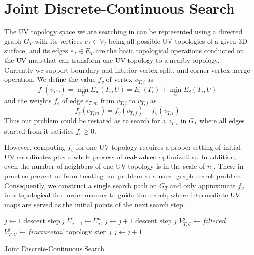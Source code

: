 
\section{Joint Discrete-Continuous Search}

The UV topology space we are searching in can be represented using a directed graph $G_T$ with its vertices $v_T \in V_T$ being all possible UV topologies of a given 3D surface, and its edges $e_T \in E_T$ are the basic topological operations conducted on the UV map that can transform one UV topology to a nearby topology. Currently we support boundary and interior vertex split, and corner vertex merge operation.
We define the value $f_v$ of vertex $v_{T,i}$ as 
\[ f_v(v_{T,i}) = \min_{U} E_w(T_i, U) = E_s(T_i) + \min_{U} E_d(T_i, U) \]
and the weights $f_e$ of edge $e_{T,m}$ from $v_{T,i}$ to $v_{T,j}$ as 
\[ f_e(e_{T,m}) = f_v(v_{T,j}) - f_v(v_{T,i}) \]
Thus our problem could be restated as to search for a $v_{T,i}$ in $G_T$ where all edges started from it satisfies $f_e \geq 0$.

However, computing $f_v$ for one UV topology requires a proper setting of initial UV coordinates plus a whole process of real-valued optimization. In addition, even the number of neighbors of one UV topology is in the scale of $n_v$. These in practice prevent us from treating our problem as a usual graph search problem. Consequently, we construct a single search path on $G_T$ and only approximate $f_v$ in a topological first-order manner to guide the search, where intermediate UV maps are served as the initial points of the next search step.

\begin{algorithm}[h]
\SetAlgoLined
{}
$j \leftarrow 1$\;
{
	descent step $j$\;
	$U_{j+1} \leftarrow U^a_j$, $j \leftarrow j+1$\;
}
{
	descent step $j$\;
	{
		$V^j_{T,C} \leftarrow filtered$\;
	}
	{
		$V^j_{T,C} \leftarrow fracture tail$\;
	}
	topology step $j$\;
	$j \leftarrow j+1$\;
}
\caption{Joint Discrete-Continuous Search}
\label{alg:DCSearch}
\end{algorithm}

